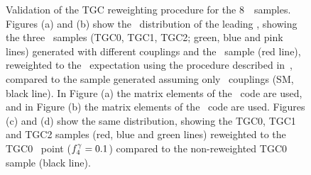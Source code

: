 \begin{figure}[htbp]
\begin{center}
\caption[Validation of the TGC reweighting procedure for the 8~\tev\ samples.]{
\small
Validation of the TGC reweighting procedure for the 8~\tev\ samples. Figures (a) and (b) show the \pt\
distribution of the leading \leppair, showing the three \TGC\ samples (TGC0,
TGC1, TGC2; green, blue and pink lines) generated with different couplings and
the \sm\ sample (red line), reweighted to the \sm\
expectation using the procedure described in~, compared to the sample
generated assuming only \sm\ couplings (SM, black line). In Figure (a) the matrix elements
of the \BR\ code are used, and in Figure (b) the matrix elements of
the \BHO\ code are used. Figures (c) and (d) show the same distribution,
showing the TGC0, TGC1 and TGC2 samples (red, blue and green lines) reweighted to the TGC0 \TGC\ point
($f_{4}^{\gamma}=0.1$) compared to the non-reweighted TGC0 sample (black line).
 }
\label{fig:TGC-reweight}
\end{center}
\end{figure}

